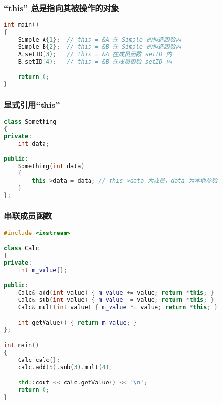 \documentclass[../../LearnCpp.tex]{subfiles}
\begin{document}
\subsubsection*{“this” 总是指向其被操作的对象}

\begin{lstlisting}[language=C++]
int main()
{
    Simple A{1};  // this = &A 在 Simple 的构造函数内
    Simple B{2};  // this = &B 在 Simple 的构造函数内
    A.setID(3);   // this = &A 在成员函数 setID 内
    B.setID(4);   // this = &B 在成员函数 setID 内

    return 0;
}
\end{lstlisting}

\subsubsection*{显式引用“this”}

\begin{lstlisting}[language=C++]
class Something
{
private:
    int data;

public:
    Something(int data)
    {
        this->data = data; // this->data 为成员，data 为本地参数
    }
};
\end{lstlisting}

\subsubsection*{串联成员函数}

\begin{lstlisting}[language=C++]
#include <iostream>

class Calc
{
private:
    int m_value{};

public:
    Calc& add(int value) { m_value += value; return *this; }
    Calc& sub(int value) { m_value -= value; return *this; }
    Calc& mult(int value) { m_value *= value; return *this; }

    int getValue() { return m_value; }
};

int main()
{
    Calc calc{};
    calc.add(5).sub(3).mult(4);

    std::cout << calc.getValue() << '\n';
    return 0;
}
\end{lstlisting}
\end{document}
